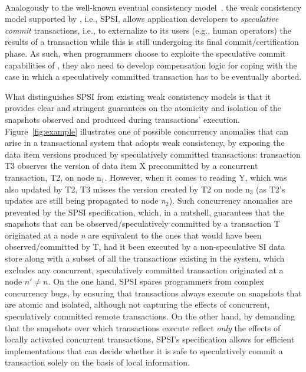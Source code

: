 ~\\
 Analogously to the well-known eventual consistency model~\cite{eventual-consistency}, the weak consistency model supported by \specula, i.e., SPSI, allows application developers to \textit{speculative commit} transactions, i.e., to externalize to its users (e.g., human operators) the results of a transaction while this is still undergoing its final commit/certification phase. As such, when programmers choose to exploite the speculative commit capabilities of \specula, they also need to develop compensation logic for coping with the case in which a speculatively committed transaction has to be eventually aborted.  

What distinguishes SPSI from existing weak consistency models is that it provides clear and stringent guarantees on the atomicity and isolation of the snapshots observed and produced during transactions' execution. Figure~\ref{fig:example} illustrates one of possible concurrency anomalies that can arise in a transactional system that adopts weak consistency, by exposing the data item versions produced by speculatively committed transactions: transaction T3 observes the version of data item X precommitted by a concurrent transaction, T2, on node n$_1$. However, when it comes to reading Y, which was also updated by T2, T3 misses the version created by T2 on node n$_3$ (as T2's updates are still being propagated to node \textit{n$_2$}). Such concurrency anomalies are prevented by the SPSI specification, which, in a nutshell, guarantees that the snapshots that can be observed/speculatively committed by a transaction T originated at a node \textit{n}
%
% 
 are equivalent to the ones that would have been observed/committed by T, had it been executed by a non-speculative SI data store along with a subset of all the transactions existing in the system, which excludes any concurrent, speculatively committed transaction originated at a node $n'\neq n$.
% 
% 
%  
% 
 On the one hand,  SPSI  spares programmers from complex concurrency bugs, by ensuring that  transactions always execute on snapshots that are atomic and isolated, although not capturing the effects of concurrent, speculatively committed remote transactions. On the other hand, by demanding that the snapshots over which transactions execute reflect \textit{only} the effects of locally activated concurrent transactions, SPSI's specification allows for efficient implementations that can decide whether it is safe to speculatively commit a transaction solely on the basis of local information.

